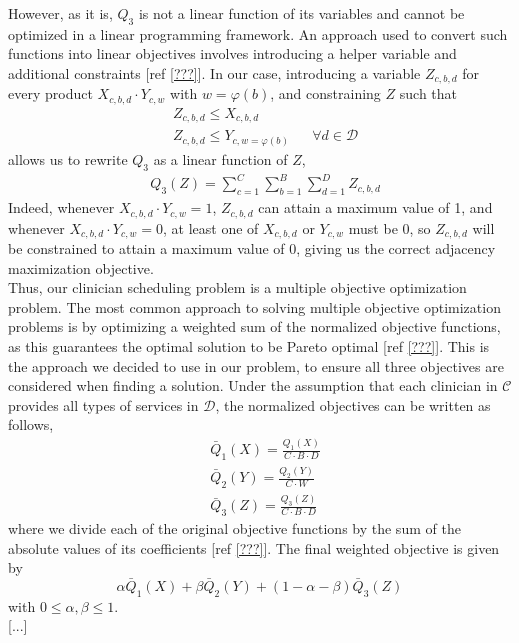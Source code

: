 However, as it is, $Q_3$ is not a linear function of its variables and cannot be optimized in a linear programming framework. An approach used to convert such functions into linear objectives involves introducing a helper variable and additional constraints [ref \ref{???}]. In our case, introducing a variable $Z_{c, b, d}$ for every product $X_{c, b, d} \cdot Y_{c, w}$ with $w = \varphi(b)$, and constraining $Z$ such that 
\begin{align}
	&Z_{c, b, d} \leq X_{c, b, d} \\
	&Z_{c, b, d} \leq Y_{c, w=\varphi(b)} &&\forall d\in\mathcal{D}
\end{align}
allows us to rewrite $Q_3$ as a linear function of $Z$,
\begin{align}
	&Q_3(Z) = \sum_{c=1}^{C} \sum_{b=1}^{B} \sum_{d=1}^{D} Z_{c, b, d}
\end{align}
Indeed, whenever $X_{c, b, d} \cdot Y_{c, w} = 1$, $Z_{c, b, d}$ can attain a maximum value of 1, and whenever $X_{c, b, d} \cdot Y_{c, w} = 0$, at least one of $X_{c, b, d}$ or $Y_{c, w}$ must be 0, so $Z_{c, b, d}$ will be constrained to attain a maximum value of 0, giving us the correct adjacency maximization objective. \\

Thus, our clinician scheduling problem is a multiple objective optimization problem. The most common approach to solving multiple objective optimization problems is by optimizing a weighted sum of the normalized objective functions, as this guarantees the optimal solution to be Pareto optimal [ref \ref{???}]. This is the approach we decided to use in our problem, to ensure all three objectives are considered when finding a solution. Under the assumption that each clinician in $\mathcal{C}$ provides all types of services in $\mathcal{D}$, the normalized objectives can be written as follows,
\begin{align}
	&\bar{Q}_1(X) = \frac{Q_1(X)}{C \cdot B \cdot D} \tag{Block Requests} \label{eqn:norm-obj-block-requests}\\
	&\bar{Q}_2(Y) = \frac{Q_2(Y)}{C \cdot W} \tag{Weekend Requests} \label{eqn:norm-obj-weekend-requests} \\
	&\bar{Q}_3(Z) = \frac{Q_3(Z)}{C \cdot B \cdot D} \tag{Block-Weekend Adjacency} \label{eqn:norm-obj-block-weekend-adj}
\end{align}
where we divide each of the original objective functions by the sum of the absolute values of its coefficients [ref \ref{???}]. The final weighted objective is given by
\begin{equation}
	\alpha \bar{Q}_1(X) + \beta \bar{Q}_2(Y) + (1 - \alpha - \beta) \bar{Q}_3(Z)
\end{equation}
with $0 \leq \alpha, \beta \leq 1$. \\

[...]
